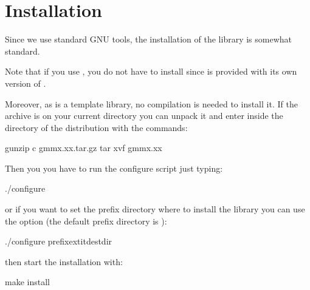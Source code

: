 \documentclass[a4paper,11pt,english]{sphinxmanual}
\begin{document}
\chapter{Installation}
\label{\detokenize{gmm/install:installation}}\label{\detokenize{gmm/install:gmm-install}}\label{\detokenize{gmm/install::doc}}
\sphinxAtStartPar
Since we use standard GNU tools, the installation of the  library is somewhat standard.

\sphinxAtStartPar
Note that if you use , you do not have to install  since  is provided with its own version of .

\sphinxAtStartPar
Moreover, as  is a template library, no compilation is needed to install it. If the   archive is on your current directory you can unpack it and enter inside the directory of the distribution  with the commands:

\begin{sphinxVerbatim}[commandchars=\\\{\}]
gunzip \PYGZhy{}c gmm\PYGZhy{}x.xx.tar.gz  tar xvf \PYGZhy{}
  gmm\PYGZhy{}x.xx
\end{sphinxVerbatim}

\sphinxAtStartPar
Then you you have to run the configure script just typing:

\begin{sphinxVerbatim}[commandchars=\\\{\}]
./configure
\end{sphinxVerbatim}

\sphinxAtStartPar
or if you want to set the prefix directory where to install the library you can use the  option (the default prefix directory is ):

\begin{sphinxVerbatim}[commandchars=\\\{\}]
./configure \PYGZhy{}\PYGZhy{}prefixextitdest\PYGZus{}dir
\end{sphinxVerbatim}

\sphinxAtStartPar
then start the installation with:

\begin{sphinxVerbatim}[commandchars=\\\{\}]
make install
\end{sphinxVerbatim}
\end{document}
